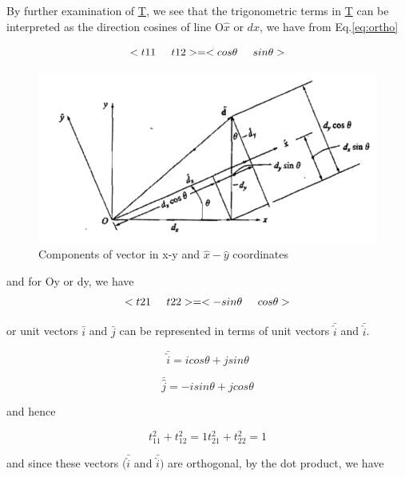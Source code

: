 \documentclass[12pt]{report}
\newcommand{\lab}[1]{
	Eq.\ref{#1}
}
\begin{document}
By further examination of \underline{T}, we see that the trigonometric terms in
\underline{T} can be interpreted as the direction cosines of line O$\hat{x}$ or
$d{x}$, we have from \lab{eq:ortho}

\begin{equation}
	<{t11}\hspace{0.5cm}{t12}>=<{cos\theta}\hspace{0.5cm}{sin\theta}>
\end{equation}

\begin{figure}
	\includegraphics[scale=0.5]{ortho.PNG}
	\caption{Components of vector in x-y and $\hat{x}-\hat{y}$ coordinates} 
	\label{fig:orthof}
\end{figure}
and for Oy or dy, we have
\begin{equation}
	<{t21}\hspace{0.5cm}{t22}>=<{-sin\theta}\hspace{0.5cm}{cos\theta}>
\end{equation}

or unit vectors $\bar{i}$ and $\bar{j}$ can be represented in terms of
unit vectors $\bar{\hat{i}}$ and $\bar{\hat{i}}$.

\begin{equation}
	\bar{\hat{i}} =icos\theta+jsin\theta
\end{equation}

\begin{equation}
	\bar{\hat{j}} =-isin\theta+jcos\theta
\end{equation}

and hence

\begin{equation}
	{t}^2_{11} + {t}^2_{12}=1 
	{t}^2_{21} + {t}^2_{22}=1
\end{equation}

and since these vectors $(\bar{\hat{i}}$ and $\bar{\hat{i}})$ are
orthogonal, by the dot product, we have
\end{document}
